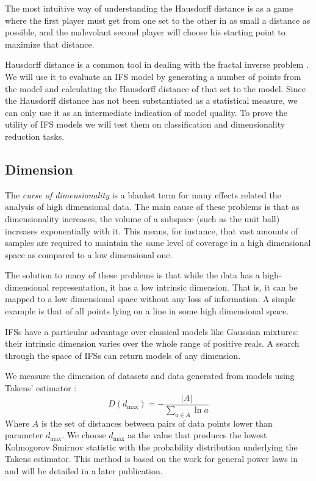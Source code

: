 \documentclass[10pt,a4paper,oneside]{article}
\theoremstyle{definition}
\begin{document}
The most intuitive way of understanding the Hausdorff distance is as a game where the first player must get from one set to the other in as small a distance as possible, and the malevolant second player will choose his starting point to maximize that distance.

Hausdorff distance is a common tool in dealing with the fractal inverse problem \cite{nettleton1994evolutionary}. We will use it to evaluate an IFS model by generating a number of points from the model and calculating the Hausdorff distance of that set to the model. Since the Hausdorff distance has not been substantiated as a statistical measure, we can only use it as an intermediate indication of model quality. To prove the utility of IFS models we will test them on classification and dimensionality reduction tasks.

\subsection*{Dimension}

The \textit{curse of dimensionality} is a blanket term for many effects related the analysis of high dimensional data. The main cause of these problems is that as dimensionality increases, the volume of a subspace (such as the unit ball) increases exponentially with it. This means, for instance, that vast amounts of samples are required to maintain the same level of coverage in a high dimensional space as compared to a low dimensional one. 

The solution to many of these problems is that while the data has a high-dimensional representation, it has a low intrinsic dimension. That is, it can be mapped to a low dimensional space without any loss of information. A simple example is that of all points lying on a line in some high dimensional space. 

IFSs have a particular advantage over classical models like Gaussian mixtures: their intrinsic dimension varies over the whole range of positive reals. A search through the space of IFSs can return models of any dimension.

We measure the dimension of datasets and data generated from models using Takens' estimator \cite{takens1985numerical}:
\[
D(d_{\mbox{max}}) = -\frac{|A|}{\sum_{a \in A} \ln a} 
\]
Where $A$ is the set of distances between pairs of data points lower than parameter $d_{\mbox{max}}$. We choose $d_{\mbox{max}}$ as the value that produces the lowest Kolmogorov Smirnov statistic with the probability distribution underlying the Takens estimator. This method is based on the work for general power laws in \cite{clauset2009power} and will be detailed in a later publication. 
\end{document}
